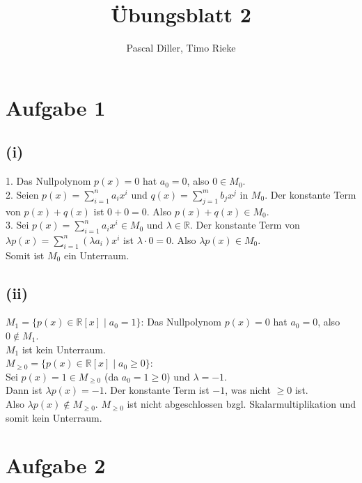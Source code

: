 \documentclass{article}
\title{Übungsblatt 2}
\author{Pascal Diller, Timo Rieke}
\begin{document}
\maketitle

\section*{Aufgabe 1}
\subsection*{(i)}
1. Das Nullpolynom $p(x) = 0$ hat $a_0 = 0$, also $0 \in M_0$. \\
2. Seien $p(x) = \sum_{i=1}^n a_i x^i$ und $q(x) = \sum_{j=1}^m b_j x^j$ in $M_0$. Der konstante Term von $p(x)+q(x)$ ist $0+0=0$. Also $p(x)+q(x) \in M_0$. \\
3. Sei $p(x) = \sum_{i=1}^n a_i x^i \in M_0$ und $\lambda \in \mathbb{R}$. Der konstante Term von $\lambda p(x) = \sum_{i=1}^n (\lambda a_i) x^i$ ist $\lambda \cdot 0 = 0$. Also $\lambda p(x) \in M_0$. \\
Somit ist $M_0$ ein Unterraum.

\subsection*{(ii)} 
$M_1 = \{ p(x) \in \mathbb{R}[x] \mid a_0 = 1 \}$: Das Nullpolynom $p(x)=0$ hat $a_0=0$, also $0 \notin M_1$. \\ $M_1$ ist kein Unterraum. \\ 
$M_{\ge 0} = \{ p(x) \in \mathbb{R}[x] \mid a_0 \ge 0 \}$: \\
Sei $p(x) = 1 \in M_{\ge 0}$ (da $a_0=1 \ge 0$) und $\lambda = -1$. \\
Dann ist $\lambda p(x) = -1$. Der konstante Term ist $-1$, was nicht $\ge 0$ ist. \\
Also $\lambda p(x) \notin M_{\ge 0}$. $M_{\ge 0}$ ist nicht abgeschlossen bzgl. Skalarmultiplikation und somit kein Unterraum.

\section*{Aufgabe 2}
\end{document}
